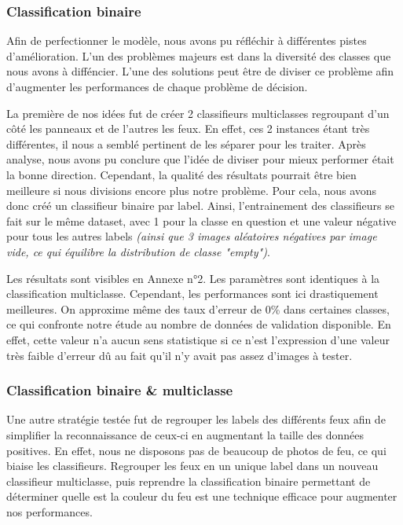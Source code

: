 \documentclass[a4paper,11pt]{article}
\begin{document}
\subsubsection{Classification binaire}

Afin de perfectionner le modèle, nous avons pu réfléchir à différentes pistes d'amélioration. L'un des problèmes majeurs est dans la diversité des classes que nous avons à difféncier. L'une des solutions peut être de diviser ce problème afin d'augmenter les performances de chaque problème de décision. 

\vspace{2mm}

\noindent La première de nos idées fut de créer 2 classifieurs multiclasses regroupant d'un côté les panneaux et de l'autres les feux. En effet, ces 2 instances étant très différentes, il nous a semblé pertinent de les séparer pour les traiter. 
Après analyse, nous avons pu conclure que l'idée de diviser pour mieux performer était la bonne direction. Cependant, la qualité des résultats pourrait être bien meilleure si nous divisions encore plus notre problème. Pour cela, nous avons donc créé un classifieur binaire par label. Ainsi, l'entrainement des classifieurs se fait sur le même dataset, avec 1 pour la classe en question et une valeur négative pour tous les autres labels \textit{(ainsi que 3 images aléatoires négatives par image vide, ce qui équilibre la distribution de classe "empty")}.

\vspace{2mm}

\noindent Les résultats sont visibles en Annexe n°2. Les paramètres sont identiques à la classification multiclasse. Cependant, les performances sont ici drastiquement meilleures. On approxime même des taux d'erreur de 0\% dans certaines classes, ce qui confronte notre étude au nombre de données de validation disponible. En effet, cette valeur n'a aucun sens statistique si ce n'est l'expression d'une valeur très faible d'erreur dû au fait qu'il n'y avait pas assez d'images à tester.

\subsubsection{Classification binaire \& multiclasse}

Une autre stratégie testée fut de regrouper les labels des différents feux afin de simplifier la reconnaissance de ceux-ci en augmentant la taille des données positives. En effet, nous ne disposons pas de beaucoup de photos de feu, ce qui biaise les classifieurs. Regrouper les feux en un unique label dans un nouveau classifieur multiclasse, puis reprendre la classification binaire permettant de déterminer quelle est la couleur du feu est une technique efficace pour augmenter nos performances.
\end{document}
